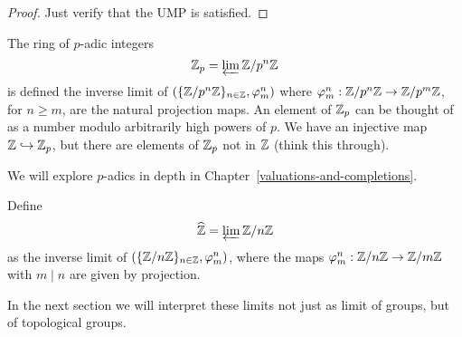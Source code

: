 \begin{proof}
Just verify that the UMP is satisfied.
\end{proof}
\begin{ex}
The ring of $p$-adic integers 
\[\mathbb{Z}_p=\varprojlim \mathbb{Z}/p^n\mathbb{Z}\]
is defined the inverse limit of %
$(\{\mathbb{Z}/p^n\mathbb{Z}\}_{n\in \mathbb{Z}},\varphi^n_m)$ where $\varphi^n_m:\mathbb{Z}/p^n\mathbb{Z}\to \mathbb{Z}/p^m\mathbb{Z}$, for $n\ge m$, are the natural projection maps.
An element of $\mathbb{Z}_p$ can be thought of as a number modulo arbitrarily high powers of $p$. We have an injective map $\mathbb{Z}\hookrightarrow \mathbb{Z}_p$, but there are elements of $\mathbb{Z}_p$ not in $\mathbb{Z}$ (think this through).

We will explore $p$-adics in depth in Chapter~\ref{valuations-and-completions}.
\end{ex}
\begin{ex}
Define 
\[\widehat{\mathbb{Z}}=\varprojlim\mathbb{Z}/n\mathbb{Z}\]
as the inverse limit of $(\{\mathbb{Z}/n\mathbb{Z}\}_{n\in \mathbb{Z}}, \varphi^n_m)$, where the maps $\varphi^n_m:\mathbb{Z}/n\mathbb{Z}\to \mathbb{Z}/m\mathbb{Z}$ with $m\mid n$ are given by projection. %
\end{ex}
In the next section we will interpret these limits not just as limit of groups, but of topological groups.
